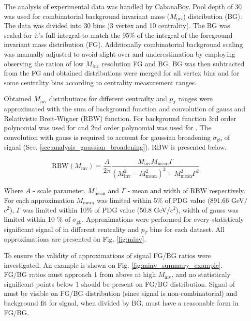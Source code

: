 The analysis of experimental data was handled by CabanaBoy. 
Pool depth of 30 was used for combinatorial background invariant mass ($M_{\text{inv}}$) distribution (BG). 
The data was divided into 30 bins (3 vertex and 10 centrality). 
The BG was scaled for it's full integral to match the 95\% of the integral of the foreground invariant mass distribution (FG).
Additionally combinatorial background scaling was manually adjusted to avoid slight over and underestimation by employing observing the ration of low $M_{inv}$ resolution FG and BG.
BG was then subtracted from the FG and obtained distributions were merged for all vertex bins and for some centrality bins according to centrality measurement ranges.

Obtained $M_{\text{inv}}$ distributions for different centrailty and $p_T$ ranges were approximated with the sum of background function and convolution of gauss and Relativistic Breit-Wigner (RBW) function.
For background function 3rd order polynomial was used for \nopid and 2nd order polynomial was used for \onepid.
The convolution with gauss is required to account for gaussian broadening $\sigma_{\text{gb}}$ of \kstar signal (Sec. \ref{sec:analysis_gaussian_broadening}).
RBW is presented below.

\begin{equation}
\text{RBW}(M_{\text{inv}}) = \frac{A}{2\pi} \frac{M_{\text{inv}} M_{\text{mean}} \Gamma}{\left( M_{\text{inv}}^2 - M_{\text{mean}}^2 \right)^2 + M_{\text{mean}}^2 \Gamma^2}
\end{equation}

Where $A$ - scale parameter, $M_{\text{mean}}$ and $\Gamma$ - mean and width of \kstar RBW respectively. 
For each approximation $M_{\text{mean}}$ was limited within 5\% of PDG value (891.66 GeV/$c^2$), $\Gamma$ was limited within 10\% of PDG value (50.8 GeV/$c^2$), width of gauss was limited within 10 \% of $\sigma_{\text{gb}}$.
Approximations were performed for every statisticaly significant signal of \kstar in different centrality and $p_T$ bins for each dataset. 
All approximations are presented on Fig. \ref{fig:minv}.

To ensure the validity of approximations of \kstar signal FG/BG ratios were investigated. 
An example is shown on Fig. \ref{fig:minv_summary_example}. 
FG/BG ratios must approach 1 from above at high $M_{\text{inv}}$, and no statisticaly significant points below 1 should be present on FG/BG distribution. 
Signal of \kstar must be visible on FG/BG distribution (since \kstar signal is non-combinatorial) and background fit for \kstar signal, when divided by BG, must have a reasonable form in FG/BG.
